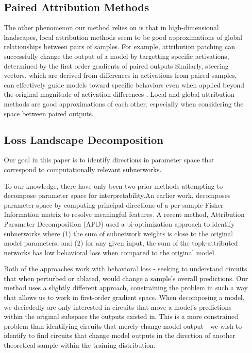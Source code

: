 \documentclass{article}
\theoremstyle{plain}
\theoremstyle{definition}
\theoremstyle{remark}
\begin{document}
\subsection{Paired Attribution Methods}

The other phenomenon our method relies on is that in high-dimensional landscapes, local attribution methods seem to be good approximations of global relationships between pairs of samples. For example, attribution patching can successfully change the output of a model by targetting specific activations, determined by the first order gradients of paired outputs \cite{nanda2023attribution,kramar2024atp,syed2023attribution} Similarly, steering vectors, which are derived from differences in activations from paired samples, can effectively guide models toward specific behaviors even when applied beyond the original magnitude of activation differences \cite{turner2023steering,subramani2022extracting}. Local and global attribution methods are good approximations of each other, especially when considering the space between paired outputs. 


\subsection{Loss Landscape Decomposition}

Our goal in this paper is to identify directions in parameter space that correspond to computationally relevant subnetworks. 

To our knowledge, there have only been two prior methods attempting to decompose parameter space for interpretability.An earlier work\cite{matena2023npeff},  decomposes parameter space by computing principal directions of a per-sample Fisher Information matrix to resolve meaningful features.  A recent method, Attribution Parameter Decomposition (APD) \cite{braun2025interpretability} used a bi-optimization approach to identify subnetworks where (1) the sum of subnetwork weights is close to the original model parameters, and (2) for any given input, the sum of the topk-attributed networks has low behavioral loss when compared to the original model.  

Both of the approaches work with behavioral loss - seeking to understand circuits that when perturbed or ablated, would change a sample's overall predictions. Our method uses a slightly different approach, constraining the problem in such a way that allows us to work in first-order gradient space. When decomposing a model, we deciededly are only interested in circuits that move a model's predictions within the original subspace the outputs existed in. This is a more constrained problem than identifying circuits that merely change model output - we wish to identify to find circuits that change model outputs in the direction of another theoretical sample within the training distribution. 
\end{document}
